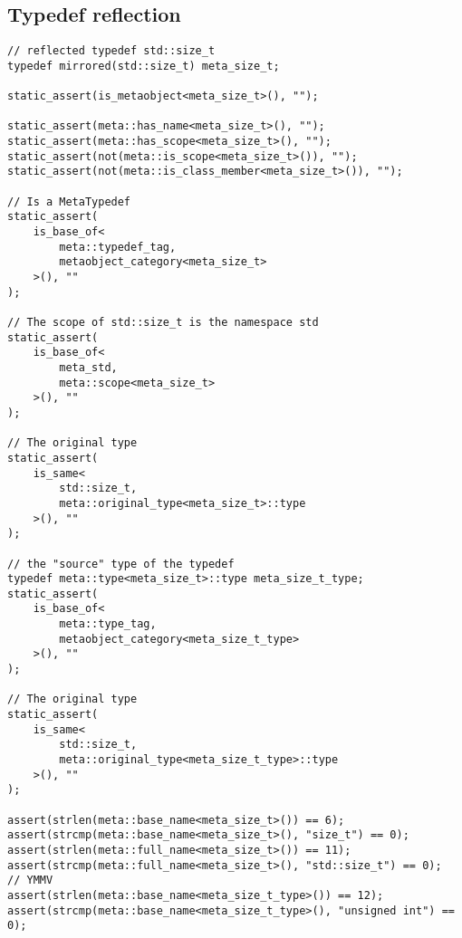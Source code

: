 \subsection{Typedef reflection}

\begin{verbatim}
// reflected typedef std::size_t
typedef mirrored(std::size_t) meta_size_t;

static_assert(is_metaobject<meta_size_t>(), "");

static_assert(meta::has_name<meta_size_t>(), "");
static_assert(meta::has_scope<meta_size_t>(), "");
static_assert(not(meta::is_scope<meta_size_t>()), "");
static_assert(not(meta::is_class_member<meta_size_t>()), "");

// Is a MetaTypedef
static_assert(
	is_base_of<
		meta::typedef_tag,
		metaobject_category<meta_size_t>
	>(), ""
);

// The scope of std::size_t is the namespace std
static_assert(
	is_base_of<
		meta_std,
		meta::scope<meta_size_t>
	>(), ""
);

// The original type
static_assert(
	is_same<
		std::size_t,
		meta::original_type<meta_size_t>::type
	>(), ""
);

// the "source" type of the typedef
typedef meta::type<meta_size_t>::type meta_size_t_type;
static_assert(
	is_base_of<
		meta::type_tag,
		metaobject_category<meta_size_t_type>
	>(), ""
);

// The original type
static_assert(
	is_same<
		std::size_t,
		meta::original_type<meta_size_t_type>::type
	>(), ""
);

assert(strlen(meta::base_name<meta_size_t>()) == 6);
assert(strcmp(meta::base_name<meta_size_t>(), "size_t") == 0);
assert(strlen(meta::full_name<meta_size_t>()) == 11);
assert(strcmp(meta::full_name<meta_size_t>(), "std::size_t") == 0);
// YMMV
assert(strlen(meta::base_name<meta_size_t_type>()) == 12);
assert(strcmp(meta::base_name<meta_size_t_type>(), "unsigned int") == 0);
\end{verbatim}

